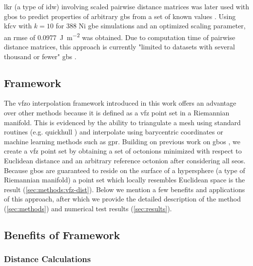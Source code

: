\documentclass[final,twocolumn,12pt]{elsarticle}
\begin{document}
\Gls{lkr} (a type of \gls{idw}) involving scaled pairwise distance matrices was later used with \glspl{gbo} to predict properties of arbitrary \glspl{gb} from a set of known values \cite{chesserLearningGrainBoundary2020}. Using \gls{kfcv} with $k=10$ for \num{388} Ni \gls{gbe} simulations \cite{olmstedSurveyComputedGrain2009a} and an optimized scaling parameter, an \gls{rmse} of \SI{0.0977}{\J\per\square\meter} was obtained. Due to computation time of pairwise distance matrices, this approach is currently "limited to datasets with several thousand or fewer" \glspl{gb} \cite{chesserLearningGrainBoundary2020}.

\subsection{ Framework}
The \gls{vfzo} interpolation framework introduced in this work offers an advantage over other methods because it is defined as a \gls{vfz} point set in a Riemannian manifold. This is evidenced by the ability to triangulate a mesh using standard routines (e.g. quickhull \cite{barberQuickhullAlgorithmConvex1996}) and interpolate using barycentric coordinates or machine learning methods such as \gls{gpr}. Building on previous work on \glspl{gbo} \cite{francisGeodesicOctonionMetric2019,chesserLearningGrainBoundary2020}, we create a \gls{vfz} point set by obtaining a set of octonions minimized with respect to Euclidean distance and an arbitrary reference octonion after considering all \glspl{seo}. Because \glspl{gbo} are guaranteed to reside on the surface of a hypersphere \cite{francisGeodesicOctonionMetric2019} (a type of Riemannian manifold) a point set which locally resembles Euclidean space is the result (\cref{sec:methods:vfz-dist}). Below we mention a few benefits and applications of this approach, after which we provide the detailed description of the method (\cref{sec:methods}) and numerical test results (\cref{sec:results}).

\subsection{Benefits of  Framework}
\subsubsection{Distance Calculations}
\label{sec:intro:distancecalculations}
\end{document}
